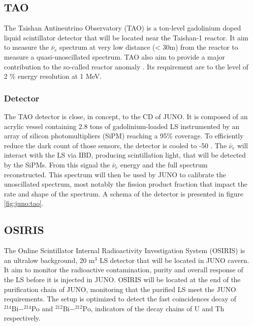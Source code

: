 \subsection{TAO}
\label{sec:juno:tao}
The Taishan Antineutrino Observatory (TAO) \cite{juno_collaboration_tao_2020, steiger_tao_2022} is a ton-level gadolinium doped liquid scintillator detector that will be located near the Taishan-1 reactor. It aim to measure the $\bar{\nu}_e$ spectrum at very low distance (< 30m) from the reactor to measure a quasi-unoscillated spectrum. TAO also aim to provide a major contribution to the so-called reactor anomaly \cite{mention_reactor_2011}. Its requirement are to the level of 2 \% energy resolution at 1 MeV.

\subsubsection{Detector}

The TAO detector is close, in concept, to the CD of JUNO. It is composed of an acrylic vessel containing 2.8 tons of gadolinium-loaded LS instrumented by an array of silicon photomultipliers (SiPM) reaching a 95\% coverage. To efficiently reduce the dark count of those sensors, the detector is cooled to -50 \textcelsius.
The $\bar{\nu}_e$ will interact with the LS via IBD, producing scintillation light, that will be detected by the SiPMs. From this signal the $\bar{\nu}_e$ energy and the full spectrum reconstructed.
This spectrum will then be used by JUNO to calibrate the unoscillated spectrum, most notably the fission product fraction that impact the rate and shape of the spectrum. A schema of the detector is presented in figure \ref{fig:juno:tao}.

\subsection{OSIRIS}
\label{sec:juno:OSIRIS}
The Online Scintillator Internal Radioactivity Investigation System (OSIRIS) \cite{juno_collaboration_design_2021} is an ultralow background, 20 m$^3$ LS detector that will be located in JUNO cavern. It aim to monitor the radioactive contamination, purity and overall response of the LS before it is injected in JUNO.
OSIRIS will be located at the end of the purification chain of JUNO, monitoring that the purified LS meet the JUNO requirements. The setup is optimized to detect the fast coincidences decay of $^{214}\mathrm{Bi}-^{214}\mathrm{Po}$ and $^{212}\mathrm{Bi}-^{212}\mathrm{Po}$, indicators of the decay chains of U and Th respectively.
